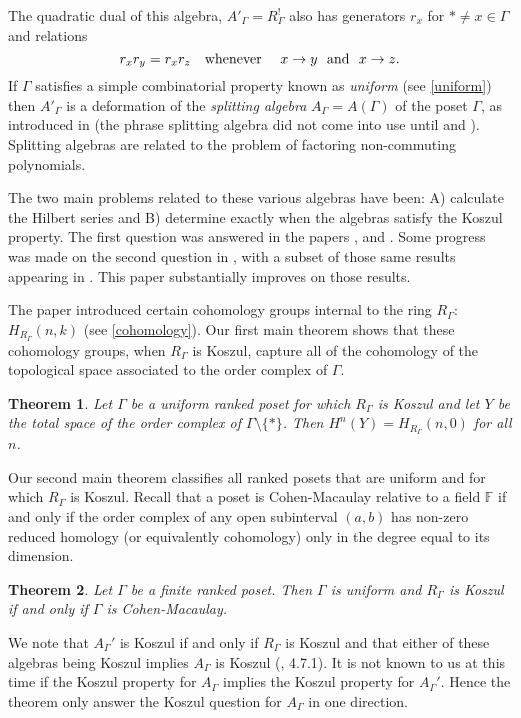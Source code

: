 \documentclass[11pt,righttag]{amsart}
\newtheorem{thm}{Theorem}[section]
\theoremstyle{definition}
\begin{document}
The quadratic dual of this algebra, $A'_\Gamma=R_\Gamma^!$ also has generators $r_x$ for $*\ne x\in \Gamma$ and relations
$$ r_x r_y = r_x r_z\ \  \hbox{\ whenever \ }\ \  x\to y\  \hbox{\ and \ }x\to z.$$
If $\Gamma$ satisfies a simple combinatorial property known as {\it uniform} (see \ref{uniform}) then $A'_\Gamma$ is a deformation of the 
{\it splitting algebra} $A_\Gamma = A(\Gamma)$ of the poset $\Gamma$, as introduced in \cite{GRSW} (the phrase splitting algebra did 
not come into use until \cite{RSW3} and \cite{CPS}).  Splitting algebras are related to the problem of factoring non-commuting polynomials.  

The two main problems related to these various algebras have been: A) calculate the Hilbert series and B) determine exactly when 
the algebras satisfy the Koszul property.  The first question was answered in the papers \cite{GGRSW}, \cite{RSW1} and \cite{RSW4}.  
Some progress was made on the second question in \cite{CPS}, with a subset of those same results appearing in \cite{RSW3}.  This paper substantially improves on those results.

The paper \cite{CPS} introduced certain cohomology groups internal to the ring $R_\Gamma$: $H_{R_\Gamma}(n,k)$ 
(see \ref{cohomology}).  Our first main theorem shows that these cohomology groups, when $R_\Gamma$ is Koszul, capture all of 
the cohomology of the topological space associated to the order complex of $\Gamma$.

\begin{thm}\label{intro1}
Let  $\Gamma$ be a uniform ranked poset for which $R_\Gamma$ is Koszul and let $Y$ be the total space of the order complex of 
$\Gamma\setminus\{*\}$.  
Then  $H^n(Y) = H_{R_\Gamma}(n,0)$ for all $n$.  
\end{thm}

Our second main theorem classifies all ranked posets that are uniform and for which $R_\Gamma$ is Koszul.  Recall that a poset is 
Cohen-Macaulay relative to a field ${{\mathbb F}}$ if and only if the order complex of any open subinterval $(a,b)$ has non-zero reduced homology 
(or equivalently cohomology) only in the degree equal to its dimension.  

\begin{thm}\label{intro2}Let $\Gamma$ be a finite ranked poset. Then $\Gamma$ is uniform and $R_\Gamma$ is Koszul if and only if 
$\Gamma$ is Cohen-Macaulay. 
\end{thm}

We note that $A_\Gamma'$ is Koszul if and only if $R_\Gamma$ is Koszul and that either of these algebras being Koszul implies 
$A_\Gamma$ is Koszul (\cite{PP}, 4.7.1).  It is not known to us at this time if the Koszul property for $A_\Gamma$ implies the Koszul 
property for $A_\Gamma'$.  Hence the theorem only answer the Koszul question for $A_\Gamma$ in one direction. 
\end{document}
